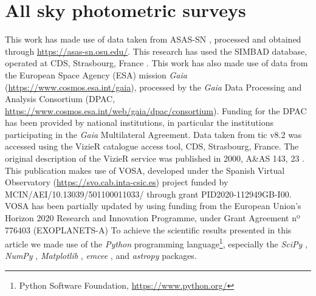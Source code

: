 \documentclass[]{aa} %
\begin{document}
\section{All sky photometric surveys}\label{sec:surveys}


\begin{acknowledgements}
      This work has made use of data taken from ASAS-SN \citep{shappee_man_2014, kochanek_all-sky_2017}, processed and obtained through \url{https://asas-sn.osu.edu/}.
This research has used the SIMBAD database, operated at CDS, Strasbourg, France \citep{wenger2000}.
%
This work has also made use of data from the European Space Agency (ESA) mission {\it Gaia} (\url{https://www.cosmos.esa.int/gaia}), processed by the {\it Gaia} Data Processing and Analysis Consortium (DPAC, \url{https://www.cosmos.esa.int/web/gaia/dpac/consortium}).
%
Funding for the DPAC has been provided by national institutions, in particular the institutions participating in the {\it Gaia} Multilateral Agreement. Data taken from tic v8.2 was accessed using the VizieR catalogue access tool, CDS, Strasbourg, France.%
%
The original description of the VizieR service was published in 2000, A\&AS 143, 23 \citep{2000A&AS..143...23O}.
%
This publication makes use of VOSA, developed under the Spanish Virtual Observatory (\url{https://svo.cab.inta-csic.es}) project funded by MCIN/AEI/10.13039/501100011033/ through grant PID2020-112949GB-I00.
%
VOSA has been partially updated by using funding from the European Union's Horizon 2020 Research and Innovation Programme, under Grant Agreement nº 776403 (EXOPLANETS-A)
%
To achieve the scientific results presented in this article we made use of the \emph{Python} programming language\footnote{Python Software Foundation, \url{https://www.python.org/}}, especially the \emph{SciPy} \citep{virtanen2020}, \emph{NumPy} \citep{numpy}, \emph{Matplotlib} \citep{Matplotlib}, \emph{emcee} \citep{foreman-mackey2013}, and \emph{astropy} \citep{astropy_1,astropy_2} packages.
\end{acknowledgements}




\end{document}

